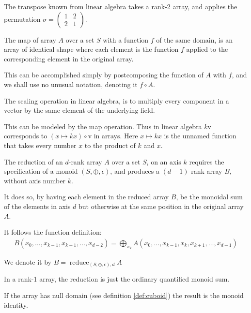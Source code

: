 \documentclass{DIKU-report-variant}
\newcommand\mrm[1]{\mathrm{#1}}
\newcommand\brm[1]{\bm{\mrm{#1}}}
\newcommand\reduce{\operatorname*{\brm{reduce}}}
\begin{document}
\begin{example}
  \label{ex:transpose}
  The transpose known from linear algebra takes a rank-2 array, and
  applies the permutation \(\sigma = \left(\begin{smallmatrix} 1 & 2 \\ 2 & 1 \end{smallmatrix}\right)\).
\end{example}

\begin{definition}
  \label{def:map}
  The map of array \(A\) over a set \(S\) with a function \(f\) of the same domain,
  is an array of identical shape where each element is the function \(f\) applied to
  the corresponding element in the original array.

  This can be accomplished simply by postcomposing the function of \(A\)
  with \(f\), and we shall use no unusual notation, denoting it \(f \circ A\).
\end{definition}

\begin{example}
  \label{ex:scaling}
  The scaling operation in linear algebra, is to multiply every component in
  a vector by the same element of the underlying field.

  This can be modeled by the map operation. Thus in linear algebra \(k\brm v\)
  corresponds to \((x \mapsto kx) \circ \brm v\) in arrays. Here \(x \mapsto kx\) is
  the unnamed function that takes every number \(x\) to the product of \(k\) and \(x\).
\end{example}

\begin{definition}
  \label{def:reduce}
  The reduction of an \(d\)-rank array \(A\) over a set \(S\), on
  an axis \(k\) requires the specification of a monoid
  \((S, \oplus, \epsilon)\), and produces a \((d-1)\)-rank array \(B\), without
  axis number \(k\).

  It does so, by having each element in the reduced array \(B\), be the monoidal sum
  of the elements in axis \(d\) but otherwise at the same position in the original array \(A\).

  It follows the function definition:
  \begin{align*}
    B(x_0,\dots,x_{k-1},x_{k+1},\dots,x_{d-2}) = \bigoplus_{x_k} A(x_0,\dots,x_{k-1},x_k,x_{k+1},\dots,x_{d-1})
  \end{align*}

  We denote it by \( B = \reduce_{(S, \oplus, \epsilon),d} A \)

  In a rank-1 array, the reduction is just the ordinary quantified monoid sum.

  If the array has null domain (see definition \ref{def:cuboid}) the result is
  the monoid identity.
\end{definition}
\end{document}

